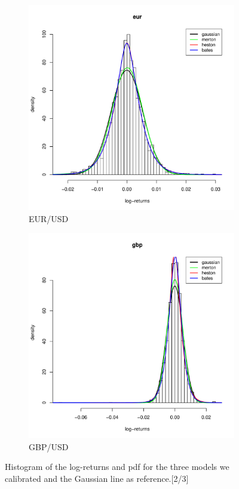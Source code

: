 \begin{figure}
\begin{subfigure}{0.44\textwidth}
	\centering
	\includegraphics[width=\linewidth]{Images/hist_eur.pdf}
	\caption{EUR/USD}
\end{subfigure}
\begin{subfigure}{0.44\textwidth}
	\centering
	\includegraphics[width=\linewidth]{Images/hist_gbp.pdf}
	\caption{GBP/USD}
\end{subfigure}

\caption[Histrogram and densities of the results (2/3)]{Histogram of the log-returns and pdf for the three models we calibrated and the Gaussian line as reference.[2/3]}
\label{fig:hist_2}
\end{figure}


